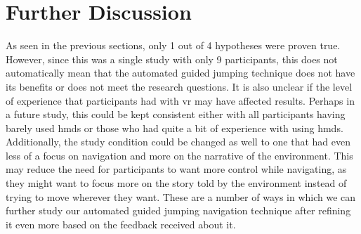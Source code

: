 \section{Further Discussion}
\label{subsection EUS: Further Discussion}
As seen in the previous sections, only 1 out of 4 hypotheses were proven true. However, since this was a single study with only 9 participants, this does not automatically mean that the automated guided jumping technique does not have its benefits or does not meet the research questions. It is also unclear if the level of experience that participants had with \acrshort{vr} may have affected results. Perhaps in a future study, this could be kept consistent either with all participants having barely used \acrshort{hmd}s or those who had quite a bit of experience with using \acrshort{hmd}s. Additionally, the study condition could be changed as well to one that had even less of a focus on navigation and more on the narrative of the environment. This may reduce the need for participants to want more control while navigating, as they might want to focus more on the story told by the environment instead of trying to move wherever they want. These are a number of ways in which we can further study our automated guided jumping navigation technique after refining it even more based on the feedback received about it.